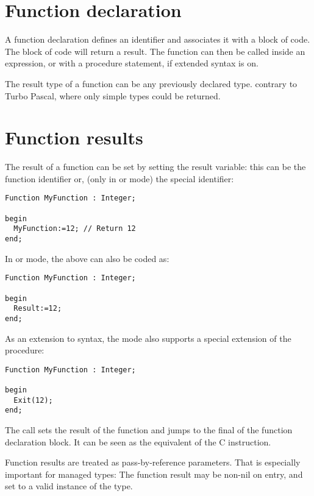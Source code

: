 \section{Function declaration}
A function declaration defines an identifier and associates it with a
block of code. The block of code will return a result.
The function can then be called inside an expression, or with a procedure
statement, if extended syntax is on.

The result type of a function can be any previously declared type.
contrary to Turbo Pascal, where only simple types could be returned.

\section{Function results}
The result of a function can be set by setting the result variable:
this can be the function identifier or, (only in  or  mode)
the special  identifier:
\begin{verbatim}
Function MyFunction : Integer;

begin
  MyFunction:=12; // Return 12
end;
\end{verbatim}
In  or  mode, the above can also be coded as:
\begin{verbatim}
Function MyFunction : Integer;

begin
  Result:=12;
end;
\end{verbatim}
As an extension to \delphi syntax, the  mode also supports a special
extension of the  procedure:
\begin{verbatim}
Function MyFunction : Integer;

begin
  Exit(12);
end;
\end{verbatim}
The  call sets the result of the function and jumps to the final
 of the function declaration block. It can be seen as the equivalent
of the C  instruction.

\begin{remark}
Function results are treated as pass-by-reference parameters.
That is especially important for managed types:
The function result may be non-nil on entry, and set to a valid instance of the type.
\end{remark}

